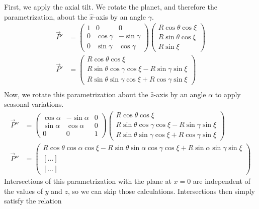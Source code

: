 \documentclass[12pt,a4paper]{article}
\begin{document}
First, we apply the axial tilt. We rotate the planet, and therefore the parametrization, about the \(\hat{x}\)-axis by an angle \(\gamma\).  
\begin{align}
\vec{P}'&= \left(\begin{array}{ccc} 1 & 0 & 0\\ 0 & \cos\gamma & -\sin\gamma \\ 0 & \sin\gamma & \cos\gamma \end{array}\right)\left(\begin{array}{c} R\cos\theta\cos\xi \\ R\sin\theta\cos\xi \\ R\sin\xi \end{array}\right) \\
\vec{P}'&=\left(\begin{array}{c} R\cos\theta\cos\xi \\ R\sin\theta\cos\gamma\cos\xi - R\sin\gamma\sin\xi \\ R\sin\theta\sin\gamma\cos\xi + R\cos\gamma\sin\xi  \end{array}\right) \\
\end{align}
Now, we rotate this parametrization about the \(\hat{z}\)-axis by an angle \(\alpha\) to apply seasonal variations.
\begin{align}
\vec{P}''&= \left(\begin{array}{ccc} \cos\alpha & -\sin\alpha & 0 \\ \sin\alpha & \cos\alpha & 0 \\ 0 & 0 & 1 \end{array}\right)\left(\begin{array}{c} R\cos\theta\cos\xi \\ R\sin\theta\cos\gamma\cos\xi - R\sin\gamma\sin\xi \\ R\sin\theta\sin\gamma\cos\xi + R\cos\gamma\sin\xi  \end{array}\right) \\
\vec{P}''&= \left(\begin{array}{c} R\cos\theta\cos\alpha\cos\xi -R \sin\theta\sin\alpha\cos\gamma\cos\xi + R\sin\alpha\sin\gamma\sin\xi \\ \left[\ldots\right] \\\left[\ldots\right] \end{array}\right) 
\end{align}
Intersections of this parametrization with the plane at \(x=0\) are independent of the values of \(y\) and \(z\), so we can skip those calculations. Intersections then simply satisfy the relation
\end{document}
